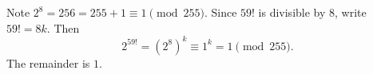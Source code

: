 Note \(2^8=256=255+1\equiv1\pmod{255}\). Since \(59!\) is divisible by \(8\), write \(59!=8k\). Then
\[
2^{59!}=(2^8)^k\equiv1^k=1\pmod{255}.
\]
The remainder is \(\boxed{1}\).
